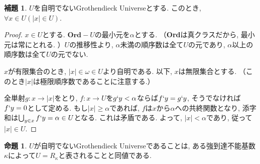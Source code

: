 \documentclass[a4paper, twoside]{bxjsarticle}
\newcommand{\abs}[1]{\left\lvert#1\right\rvert}
\theoremstyle{definition}
\newtheorem{prop}[thm]{命題}
\newtheorem{lem}[thm]{補題}
\begin{document}
        \begin{lem}\label{guiscardclosed}
            $U$を自明でないGrothendieck Universeとする. このとき, $\forall x\in U(\abs{x}\in U)$.
        \end{lem}
        \begin{proof}
            $x\in U$とする. $\textbf{Ord}-U$の最小元を$\alpha$とする. （\textbf{Ord}は真クラスだから, 最小元は常にとれる. ）$U$の推移性より, $\alpha$未満の順序数は全て$U$の元であり, $\alpha$以上の順序数は全て$U$の元でない.
            
            $x$が有限集合のとき, $\abs{x}\in\omega\in U$より自明である. 以下, $x$は無限集合とする. （このとき$\abs{x}$は極限順序数であることに注意する.）
            
            全単射$g\colon x\to \abs{x}$をとり, $f\colon x\to U$を$g`y<\alpha$ならば$f`y=g`y$, そうでなければ$f`y=0$として定める. もし$\abs{x}\geq\alpha$であれば, $f$は$x$から$\alpha$への共終関数となり, 添字和は$\bigcup_{y\in x}f`y = \alpha \in U$となる. これは矛盾である. よって, $\abs{x}<\alpha$であり, 従って$\abs{x}\in U$. 
        \end{proof}
        \begin{prop}
            $U$が自明でないGrothendieck Universeであることは, ある強到達不能基数$\kappa$によって$U=R_\kappa$と表されることと同値である.
        \end{prop}
\end{document}
